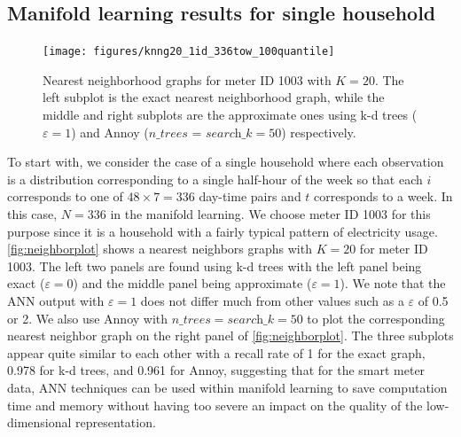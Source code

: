 \documentclass{article}
\begin{document}
\hypertarget{electricityresults}{%
\subsection{Manifold learning results for single
household}\label{electricityresults}}

\begin{figure}[!b]

{\centering \texttt{[image: figures/knng20\_1id\_336tow\_100quantile]} 

}

\caption{Nearest neighborhood graphs for meter ID 1003 with $K=20$. The left subplot is the exact nearest neighborhood graph, while the middle and right subplots are the approximate ones using k-d trees ($\varepsilon = 1$) and Annoy ($\textit{n\_trees = search\_k}=50$) respectively.}\label{fig:neighborplot}
\end{figure}

To start with, we consider the case of a single household where each
observation is a distribution corresponding to a single half-hour of the
week so that each \(i\) corresponds to one of \(48 \times 7 = 336\)
day-time pairs and \(t\) corresponds to a week. In this case, \(N=336\)
in the manifold learning. We choose meter ID 1003 for this purpose since
it is a household with a fairly typical pattern of electricity usage.
\autoref{fig:neighborplot} shows a nearest neighbors graphs with
\(K=20\) for meter ID 1003. The left two panels are found using k-d
trees with the left panel being exact (\(\varepsilon = 0\)) and the
middle panel being approximate (\(\varepsilon = 1\)). We note that the
ANN output with \(\varepsilon = 1\) does not differ much from other
values such as a \(\varepsilon\) of 0.5 or 2. We also use Annoy with
\(\textit{n\_trees}=\textit{search\_k}=50\) to plot the corresponding
nearest neighbor graph on the right panel of \autoref{fig:neighborplot}.
The three subplots appear quite similar to each other with a recall rate
of 1 for the exact graph, 0.978 for k-d trees, and 0.961 for Annoy,
suggesting that for the smart meter data, ANN techniques can be used
within manifold learning to save computation time and memory without
having too severe an impact on the quality of the low-dimensional
representation.
\end{document}
